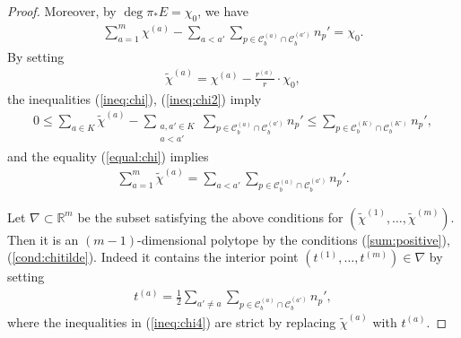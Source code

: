 \documentclass[11pt,oneside,a4paper,mathscr]{amsart}
\theoremstyle{definition}
\renewcommand{\leq}{\leqslant}
\newcommand{\cC}{\mathcal{C}}
\begin{document}
\begin{proof}
Moreover, by $\deg \pi_{*}E=\chi_0$, we have 
\begin{align}\label{equal:chi}
    \sum_{a=1}^m \chi^{(a)}
    -\sum_{a<a'}\sum_{p\in \cC_b^{(a)} \cap \cC_b^{(a')}}n_p'
    =\chi_0.
\end{align}
By setting 
\begin{align*}
    \widetilde{\chi}^{(a)}
    =
    \chi^{(a)}-\frac{r^{(a)}}{r}\cdot \chi_0,
\end{align*}
the inequalities (\ref{ineq:chi}), (\ref{ineq:chi2}) imply 
\begin{align}\label{ineq:chi4}
    0
    \leq 
    \sum_{a\in K}\widetilde{\chi}^{(a)}
    -\sum_{\substack{a,a' \in K\\ a<a'}}
    \sum_{p\in \cC_b^{(a)}\cap \cC_b^{(a')}}n_p'
    \leq 
    \sum_{p\in \cC_b^{(K)} \cap \cC_b^{(K^{\circ})}}n_p', 
\end{align}
and the equality (\ref{equal:chi}) implies 
\begin{align}\label{cond:chitilde}
    \sum_{a=1}^m \widetilde{\chi}^{(a)}
    =
    \sum_{a<a'}\sum_{p\in \cC_b^{(a)} \cap \cC_b^{(a')}}n_p'.
\end{align}

Let $\nabla \subset \mathbb{R}^m$ be the subset satisfying the above conditions for
$(\widetilde{\chi}^{(1)}, \ldots, \widetilde{\chi}^{(m)})$. Then it is an $(m-1)$-dimensional 
polytope by the conditions (\ref{sum:positive}), (\ref{cond:chitilde}). Indeed it contains 
the interior point $(t^{(1)}, \ldots, t^{(m)}) \in \nabla$ by setting 
\begin{align*}
    t^{(a)}=\frac{1}{2}\sum_{a'\neq a}
    \sum_{p\in \cC_b^{(a)} \cap \cC_b^{(a')}} n_p',
\end{align*}
where the inequalities in (\ref{ineq:chi4}) are strict by replacing $\widetilde{\chi}^{(a)}$ with $t^{(a)}$. 


\end{proof}
\end{document}
